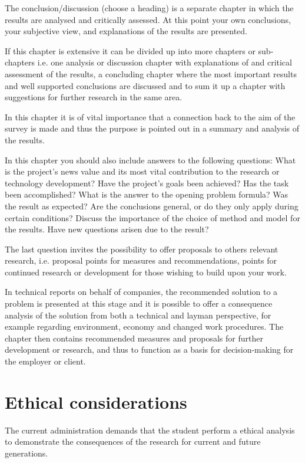 The conclusion/discussion (choose a heading) is a separate chapter in
which the results are analysed and critically assessed. At this point your
own conclusions, your subjective view, and explanations of the results
are presented.

If this chapter is extensive it can be divided up into more chapters or
sub-chapters i.e. one analysis or discussion chapter with explanations of
and critical assessment of the results, a concluding chapter where the
most important results and well supported conclusions are discussed
and to sum it up a chapter with suggestions for further research in the
same area.

In this chapter it is of vital importance that a connection back to the aim
of the survey is made and thus the purpose is pointed out in a summary
and analysis of the results.

In this chapter you should also include answers to the following
questions: What is the project's news value and its most vital
contribution to the research or technology development? Have the
project’s goals been achieved? Has the task been accomplished? What is
the answer to the opening problem formula? Was the result as expected?
Are the conclusions general, or do they only apply during certain
conditions? Discuss the importance of the choice of method and model
for the results. Have new questions arisen due to the result?

The last question invites the possibility to offer proposals to others
relevant research, i.e. proposal points for measures and
recommendations, points for continued research or development for
those wishing to build upon your work.

In technical reports on behalf of companies, the recommended solution
to a problem is presented at this stage and it is possible to offer a
consequence analysis of the solution from both a technical and layman
perspective, for example regarding environment, economy and changed
work procedures. The chapter then contains recommended measures
and proposals for further development or research, and thus to function
as a basis for decision-making for the employer or client. 
\section{Ethical considerations}
The current administration demands that the student perform a ethical 
analysis to demonstrate the consequences of the research for current 
and future generations.